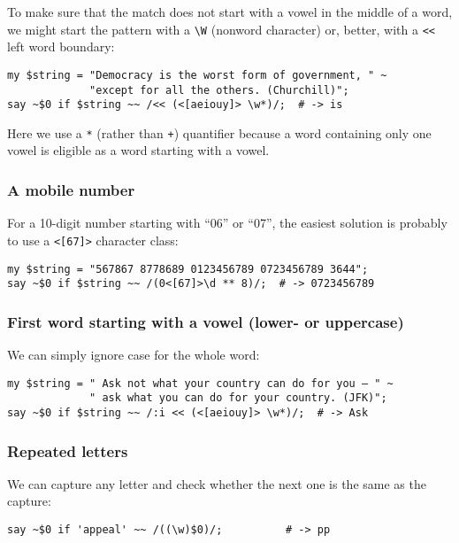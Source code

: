To make sure that the match does not start with a vowel in 
the middle of a word, we might start the pattern with a 
\verb'\W' (nonword character) or, better, with a \verb'<<' 
left word boundary:

\begin{verbatim}
my $string = "Democracy is the worst form of government, " ~
             "except for all the others. (Churchill)";
say ~$0 if $string ~~ /<< (<[aeiouy]> \w*)/;  # -> is
\end{verbatim}

Here we use a \verb'*' (rather than \verb'+') quantifier 
because a word containing only one vowel is eligible as 
a word starting with a vowel.

\subsubsection{A mobile number}

For a 10-digit number starting with ``06'' or ``07'', the 
easiest solution is probably to use a \verb'<[67]>' character 
class:

\begin{verbatim}
my $string = "567867 8778689 0123456789 0723456789 3644";
say ~$0 if $string ~~ /(0<[67]>\d ** 8)/;  # -> 0723456789
\end{verbatim}

\subsubsection{First word starting with a vowel (lower- or uppercase)}

We can simply ignore case for the whole word:
\begin{verbatim}
my $string = " Ask not what your country can do for you — " ~
             " ask what you can do for your country. (JFK)";
say ~$0 if $string ~~ /:i << (<[aeiouy]> \w*)/;  # -> Ask
\end{verbatim}

\subsubsection{Repeated letters}

We can capture any letter and check whether the next one is 
the same as the capture:

\begin{verbatim}
say ~$0 if 'appeal' ~~ /((\w)$0)/;          # -> pp
\end{verbatim}


